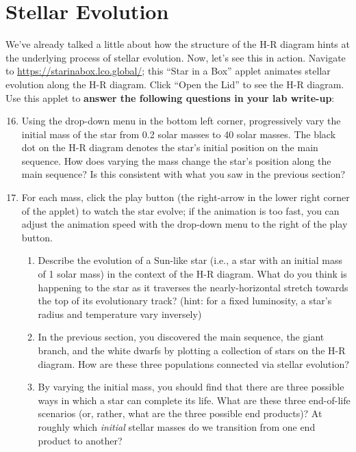 \documentclass[11pt]{article}
\begin{document}
\section{Stellar Evolution}
We've already talked a little about how the structure of the H-R diagram hints at the underlying process of stellar evolution. Now, let's see this in action. Navigate to \url{https://starinabox.lco.global/}; this ``Star in a Box'' applet animates stellar evolution along the H-R diagram. Click ``Open the Lid'' to see the H-R diagram. Use this applet to \textbf{answer the following questions in your lab write-up}:
\begin{enumerate}
\setcounter{enumi}{15}

    \item Using the drop-down menu in the bottom left corner, progressively vary the initial mass of the star from 0.2 solar masses to 40 solar masses. The black dot on the H-R diagram denotes the star's initial position on the main sequence. How does varying the mass change the star's position along the main sequence? Is this consistent with what you saw in the previous section?
    
    \item For each mass, click the play button (the right-arrow in the lower right corner of the applet) to watch the star evolve; if the animation is too fast, you can adjust the animation speed with the drop-down menu to the right of the play button.
    \begin{enumerate}
    
        \item Describe the evolution of a Sun-like star (i.e., a star with an initial mass of 1 solar mass) in the context of the H-R diagram. What do you think is happening to the star as it traverses the nearly-horizontal stretch towards the top of its evolutionary track? (hint: for a fixed luminosity, a star's radius and temperature vary inversely)  
        
        \item In the previous section, you discovered the main sequence, the giant branch, and the white dwarfs by plotting a collection of stars on the H-R diagram. How are these three populations connected via stellar evolution?
        
        \item By varying the initial mass, you should find that there are three possible ways in which a star can complete its life. What are these three end-of-life scenarios (or, rather, what are the three possible end products)? At roughly which \emph{initial} stellar masses do we transition from one end product to another?
        

\end{enumerate}
\end{enumerate}
\end{document}
